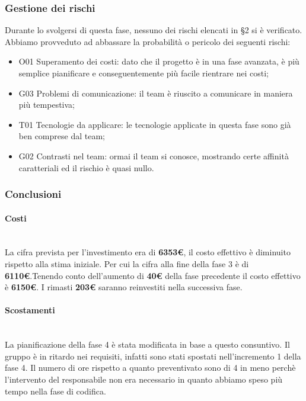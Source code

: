 	\subsubsection{Gestione dei rischi}
	Durante lo svolgersi di questa fase, nessuno dei rischi elencati in \S2 si è verificato. Abbiamo provveduto ad abbassare la probabilità o pericolo dei seguenti rischi: 
	\begin{itemize}
	\item 		O01 Superamento dei costi: dato che il progetto è in una fase avanzata, è più semplice pianificare e conseguentemente più facile rientrare nei costi;
	\item 		G03 Problemi di comunicazione: il team è riuscito a comunicare in maniera più tempestiva;
	\item		T01 Tecnologie da applicare: le tecnologie applicate in questa fase sono già ben comprese dal team;
	\item 		G02 Contrasti nel team: ormai il team si conosce, mostrando certe affinità caratteriali ed il rischio è quasi nullo.
	\end{itemize}

	\subsubsection{Conclusioni}
	\paragraph{Costi\\}\noindent\\
 La cifra prevista per l'investimento era di \textbf{6353€}, il costo effettivo è diminuito rispetto alla stima iniziale. Per cui la cifra alla fine della fase 3 è di \textbf{6110€}.Tenendo conto dell'aumento di \textbf{40€} della fase precedente il costo effettivo è \textbf{6150€}.
I rimasti \textbf{203€} saranno reinvestiti nella successiva fase.

\paragraph{Scostamenti\\}\noindent\\
La pianificazione della fase 4 è stata modificata in base a questo consuntivo.
Il gruppo è in ritardo nei requisiti, infatti sono stati spostati nell'incremento 1 della fase 4. Il numero di ore rispetto a quanto preventivato sono di 4 in meno perchè l'intervento del responsabile non era necessario in quanto abbiamo speso più tempo nella fase di codifica.

